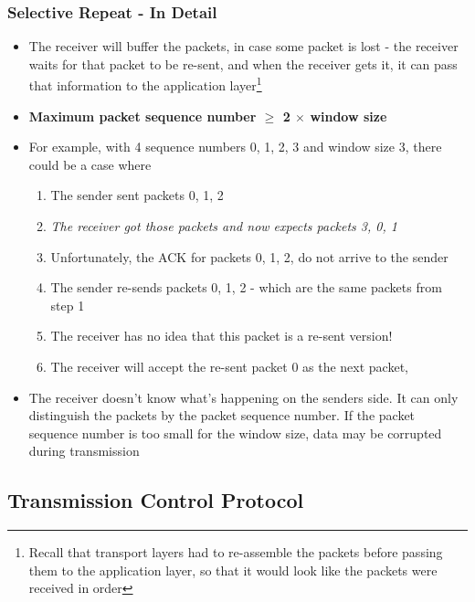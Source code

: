 \subsubsection{Selective Repeat - In Detail}
\begin{itemize}
	\item The receiver will buffer the packets, in case some packet is lost - the receiver waits for that packet to be re-sent, and when the receiver gets it, it can pass that information to the application layer\footnote{Recall that transport layers had to re-assemble the packets before passing them to the application layer, so that it would look like the packets were received in order}
	\item \textbf{Maximum packet sequence number $\geq$ 2 $\times$ window size}
	\item For example, with 4 sequence numbers 0, 1, 2, 3 and window size 3, there could be a case where
	\begin{enumerate}
		\item The sender sent packets 0, 1, 2
		\item \textit{The receiver got those packets and now expects packets 3, 0, 1}
		\item Unfortunately, the ACK for packets 0, 1, 2, do not arrive to the sender
		\item The sender re-sends packets 0, 1, 2 - which are the same packets from step 1
		\item The receiver has no idea that this packet is a re-sent version!
		\item The receiver will accept the re-sent packet 0 as the next packet,   
	\end{enumerate}
	\item The receiver doesn't know what's happening on the senders side. It can only distinguish the packets by the packet sequence number. If the packet sequence number is too small for the window size, data may be corrupted during transmission
\end{itemize}

\subsection{Transmission Control Protocol}
